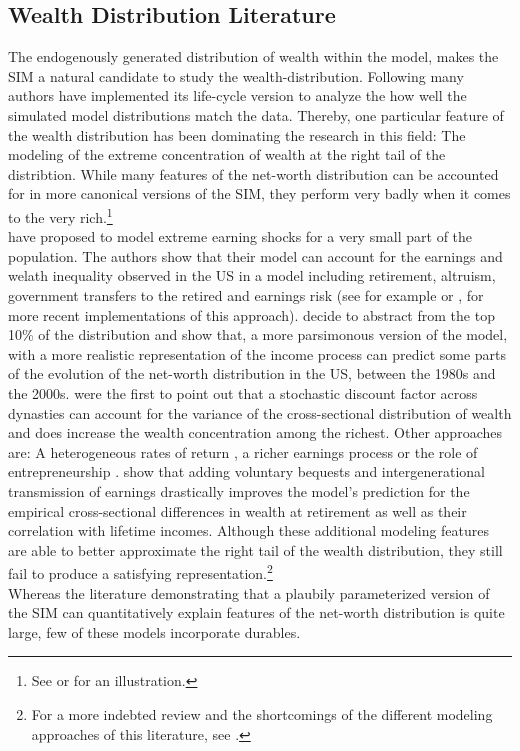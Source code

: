 \documentclass[a4paper,12pt,legno]{article}
\begin{document}
\subsection{Wealth Distribution Literature}
The endogenously generated distribution of wealth within the model, makes the SIM a natural candidate to study the wealth-distribution.
Following \cite{huggett1996wealth} many authors have implemented its life-cycle version to analyze the how well the simulated model distributions match the data. Thereby, one particular feature of the wealth distribution has been dominating the research in this field: The modeling of the extreme concentration of wealth at the right tail of the distribtion. While many features of the net-worth distribution can be accounted for in more canonical versions of the SIM, they perform very badly when it comes to the very rich.\footnote{See \cite{huggett1996wealth} or \cite{quadrini1997understanding} for an illustration.} \\
\cite{castaneda2003} have proposed to model extreme earning shocks for a very small part of the population. The authors show that their model can account for the earnings and welath inequality observed in the US in a model including retirement, altruism, government transfers to the retired and earnings risk (see for example \citep{diaz2010} or \citep{kaymak2016evolution}, for more recent implementations of this approach).  \cite{hintermaier2011} decide to abstract from the top 10\% of the distribution and show that, a more parsimonous version of the model, with a more realistic representation of the income process can predict some parts of the evolution of the net-worth distribution in the US, between the 1980s and the 2000s. \cite{krusell1998} were the first to point out that a stochastic discount factor across dynasties can account for the variance of the cross-sectional distribution of wealth and does increase the wealth concentration among the richest. Other approaches are: A heterogeneous rates of return \cite{benhabib2011distribution}, a richer earnings process \citep{denardi2016}  or the role of entrepreneurship \citep{cagetti2009}. \cite{denardi2014} show that adding voluntary bequests and intergenerational transmission of earnings drastically improves the model's prediction for the empirical cross-sectional differences in wealth at retirement as well as their correlation with lifetime incomes.  Although these additional modeling features are able to better approximate the right tail of the wealth distribution, they still fail to produce a satisfying representation.\footnote{For a more indebted review and the shortcomings of the different modeling approaches of this literature, see \citep{denardi2017}.}  \\
Whereas the literature demonstrating that a plaubily parameterized version of the SIM can quantitatively explain features of the net-worth distribution is quite large, few of these models incorporate durables.
\end{document}
